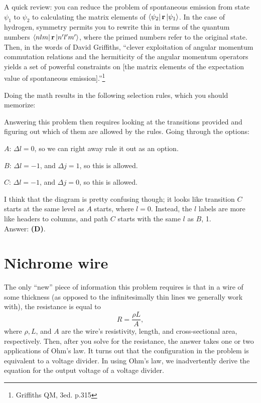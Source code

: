 \documentclass[11pt]{paper}
\newcommand{\answer}[1]{Answer: \textbf{(#1)}.}
\begin{document}
A quick review: you can reduce the problem of spontaneous emission from state $\psi_1$ to $\psi_2$ to calculating the matrix elements of $\bra{\psi_2}\mathbf{r}\ket{\psi_1}$.  In the case of hydrogen, symmetry permits you to rewrite this in terms of the quantum numbers $\bra{nlm}\mathbf{r}\ket{n'l'm'}$, where the primed numbers refer to the original state.  Then, in the words of David Griffiths, ``clever exploitation of angular momentum commutation relations and the hermiticity of the angular momentum operators yields a set of powerful constraints on [the matrix elements of the expectation value of spontaneous emission].''\footnote{Griffiths QM, 3ed. p.315}

Doing the math results in the following selection rules, which you should memorize:
\begin{center}
\end{center}

Answering this problem then requires looking at the transitions provided and figuring out which of them are allowed by the rules.  Going through the options:

$A$: $\Delta l = 0$, so we can right away rule it out as an option.

$B$: $\Delta l = -1$, and $\Delta j = 1$, so this is allowed.

$C$: $\Delta l = -1$, and $\Delta j = 0$, so this is allowed.

I think that the diagram is pretty confusing though; it looks like transition $C$ starts at the same level as $A$ starts, where $l=0$.  Instead, the $l$ labels are more like headers to columns, and path $C$ starts with the same $l$ as $B$, 1.\\

\answer{D}

\section{Nichrome wire}
The only ``new'' piece of information this problem requires is that in a wire of some thickness (as opposed to the infinitesimally thin lines we generally work with), the resistance is equal to
\begin{equation}
	R = \frac{\rho L}{A},
\end{equation}
where $\rho, L$, and $A$ are the wire's resistivity, length, and cross-sectional area, respectively.  Then, after you solve for the resistance, the answer takes one or two applications of Ohm's law.  It turns out that the configuration in the problem is equivalent to a voltage divider.  In using Ohm's law, we inadvertently derive the equation for the output voltage of a voltage divider.
\end{document}
